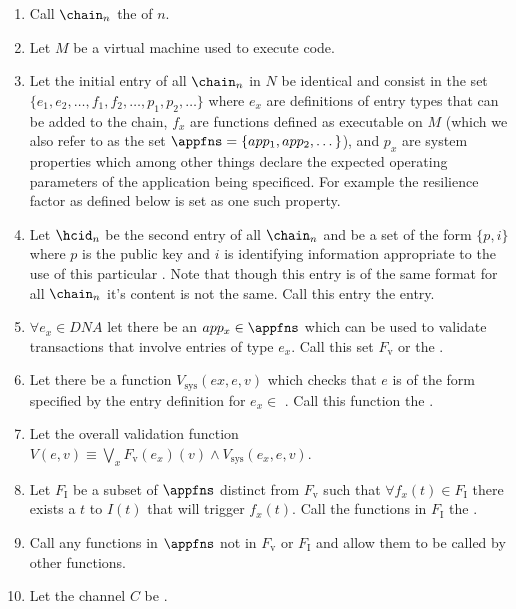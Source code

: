 \documentclass[twocolumn,showpacs,%
  nofootinbib,aps,superscriptaddress,%
  eqsecnum,prd,notitlepage,showkeys,10pt]{revtex4-1}
\begin{document}
\begin{enumerate}

\item Call $\chain_n$ the  of $n$.

\item Let $M$ be a virtual machine used to execute code.

\item Let the initial entry of all $\chain_n$ in $N$ be identical and consist in the set \hcdna $\{e_1,e_2,\dots,f_1,f_2,\dots,p_1,p_2,\dots\}$ where $e_x$ are definitions of entry types that can be added to the chain, $f_x$ are functions defined as executable on $M$ (which we also refer to as the set $\appfns = \{app_1,app_2,\dots\}$), and $p_x$ are  system properties which among other things declare the expected operating parameters of the application being specificed.  For example the resilience factor as defined below is set as one such property.

\item Let $\hcid_n$ be the second entry of all $\chain_n$ and be a set of the form $\{p,i\}$ where $p$ is the public key and $i$ is identifying information appropriate to the use of this particular \shc. Note that though this entry is of the same format for all $\chain_n$ it's content is not the same. Call this entry the  entry.

\item $\forall e_x \in DNA$ let there be an $app_x \in \appfns$ which can be used to validate transactions that involve entries of type $e_x$.  Call this set $F_\mathrm{v}$ or the .

\item Let there be a function $V_\mathrm{sys}(ex,e,v)$ which checks that $e$ is of the form specified by the entry definition for $e_x \in$ \hcdna.  Call this function the .

\item Let the overall validation function $V(e,v) \equiv \bigvee_x  F_\mathrm{v}(e_x)(v) \wedge V_\mathrm{sys}(e_x,e,v)$.

\item Let $F_\mathrm{I}$ be a subset of $\appfns$ distinct from $F_\mathrm{v}$ such that $\forall f_x(t) \in F_\mathrm{I}$ there exists a $t$ to $I(t)$ that will trigger $f_x(t)$. Call the functions in $F_\mathrm{I}$ the .

\item Call any functions in $\appfns$ not in $F_\mathrm{v}$ or $F_\mathrm{I}$  and allow them to be called by other functions.
\item Let the channel $C$ be .


\end{enumerate}
\end{document}
